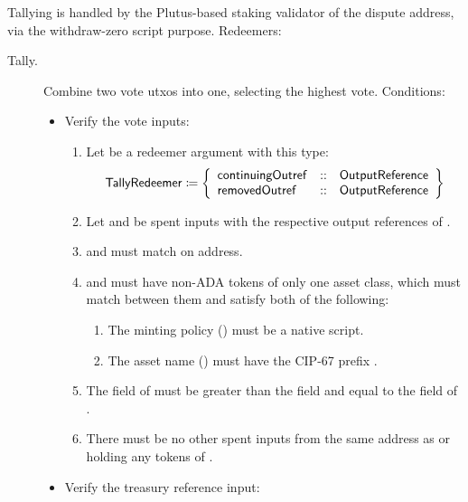 \documentclass[../hydrozoa.tex]{subfiles}
\begin{document}
Tallying is handled by the Plutus-based staking validator of the dispute address, via the withdraw-zero script purpose.
Redeemers:
\begin{description}
  \item[Tally.] Combine two vote utxos into one, selecting the highest vote.
    Conditions:
    \begin{itemize}
      \item Verify the vote inputs:
        \begin{enumerate}
          \item Let  be a redeemer argument with this type:
            \begin{equation*}
              \mathsf{TallyRedeemer} \coloneq \left\{
              \begin{array}{lll}
                \mathsf{continuingOutref} &::& \mathsf{OutputReference} \\
                \mathsf{removedOutref} &::& \mathsf{OutputReference}
              \end{array}\right\}
            \end{equation*}
          \item Let  and  be spent inputs with the respective output references of .
          \item {} and  must match on address.
          \item {} and  must have non-ADA tokens of only one asset class, which must match between them and satisfy both of the following:
            \begin{enumerate}
              \item The minting policy () must be a native script.
              \item The asset name () must have the CIP-67 prefix .
            \end{enumerate}
          \item The  field of  must be greater than the  field and equal to the  field of .
          \item There must be no other spent inputs from the same address as  or holding any tokens of .
        \end{enumerate}
      \item Verify the treasury reference input:

\end{itemize}
\end{description}
\end{document}
